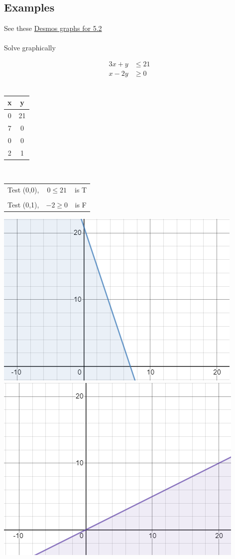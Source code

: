 \documentclass[14pt]{extarticle}
\begin{document}
\subsection{Examples}
See these \href{https://www.desmos.com/calculator/uvhr3l5lbe}{Desmos graphs for 5.2}
\\\\
Solve graphically \\
\begin{multicols}{3}
	\begin{align*}
		3x + y &\leq 21 \\
		x-2y &\geq 0
	\end{align*}
	\vspace{1.cm}
	\\ 
	\begin{tabular}{c|c}
		x & y \\ \hline
		0 & 21 \\
		7 & 0 \\ \hline
		0 & 0 \\
		2 & 1
	\end{tabular}
	\\
	\begin{tabular}{ccc}
		Test (0,0), & $0 \leq 21$ & is T \\ & & \\
		Test (0,1), & $-2 \geq 0$ & is F
	\end{tabular}
\end{multicols}
\begin{center}
\includegraphics[width=0.48\linewidth]{5-2-1a}
\includegraphics[width=0.46\linewidth]{5-2-1b}
\end{center}
\end{document}
